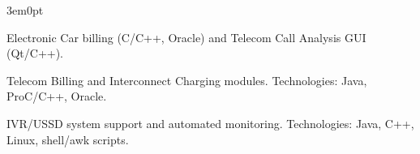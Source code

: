 \documentclass[11pt,a4paper]{article} %
\begin{document}
\begin{adjustwidth}{3em}{0pt}
\begin{leftrule}
{\begin{roleblock}
Electronic Car billing (C/C++, Oracle) and Telecom Call Analysis GUI (Qt/C++).
\end{roleblock}

\begin{roleblock}
Telecom Billing and Interconnect Charging modules. Technologies: Java, ProC/C++, Oracle.
\end{roleblock}

\begin{roleblock}
IVR/USSD system support and automated monitoring. Technologies: Java, C++, Linux, shell/awk scripts.
\end{roleblock}
}

\end{leftrule}
\end{adjustwidth}

\spacedhrule{-0.4em}{0.5em} %

\end{document}

